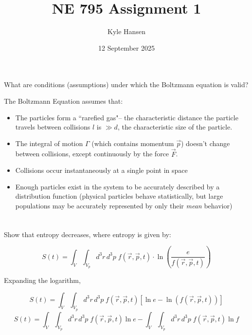 \documentclass{template}
\title{NE 795 Assignment 1}
\author{Kyle Hansen}
\date{12 September 2025}
\begin{document}
\maketitle

\section{}

What are conditions (assumptions) under which the Boltzmann equation is valid?

The Boltzmann Equation assumes that:

\begin{itemize}
    \item The particles form a ``rarefied gas"-- the characteristic distance the particle travels between collisions $l$ is $\gg d$, the characteristic size of the particle.
    \item The integral of motion $\Gamma$ (which contains momentum $\vec{p}$) doesn't change between collisions, except continuously by the force $\vec{F}$.
    \item Collisions occur instantaneously at a single point in space
    \item Enough particles exist in the system to be accurately described by a distribution function (physical particles behave statistically, but large populations may be accurately represented by only their \textit{mean} behavior)
\end{itemize}

\section{} Show that entropy decreases, where entropy is given by:

\begin{equation}
    S(t) = \int_{V}\int_{V_p}d^3r\,d^3p\;f(\vec{r}, \vec{p}, t) \cdot \ln\left(\frac{e}{f(\vec{r}, \vec{p}, t)}\right)
\end{equation}

Expanding the logarithm,

\begin{equation}
    S(t) = \int_{V}\int_{V_p}d^3r\,d^3p\;f(\vec{r}, \vec{p}, t) \left[ \ln e-\ln\left( f\left(\vec{r}, \vec{p}, t\right) \right) \right]
\end{equation}
\begin{equation}
     S(t) = \int_{V}\int_{V_p}d^3r\,d^3p\;f(\vec{r}, \vec{p}, t)  \ln e-\int_{V}\int_{V_p}d^3r\,d^3p\;f(\vec{r}, \vec{p}, t) \ln f
\end{equation}
\end{document}
